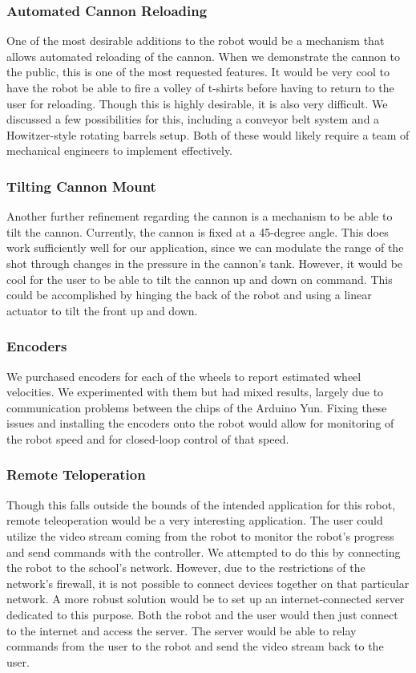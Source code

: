 \documentclass[letterpaper,12pt]{article}
\begin{document}
\subsubsection{Automated Cannon Reloading}
One of the most desirable additions to the robot would be a mechanism that
allows automated reloading of the cannon. When we demonstrate the cannon to the
public, this is one of the most requested features. It would be very cool to
have the robot be able to fire a volley of t-shirts before having to return to
the user for reloading. Though this is highly desirable, it is also very
difficult. We discussed a few possibilities for this, including a conveyor belt
system and a Howitzer-style rotating barrels setup. Both of these would likely
require a team of mechanical engineers to implement effectively.

\subsubsection{Tilting Cannon Mount}
Another further refinement regarding the cannon is a mechanism to be able to
tilt the cannon. Currently, the cannon is fixed at a 45-degree angle. This does
work sufficiently well for our application, since we can modulate the range of
the shot through changes in the pressure in the cannon's tank. However, it would
be cool for the user to be able to tilt the cannon up and down on command. This
could be accomplished by hinging the back of the robot and using a linear
actuator to tilt the front up and down.

\subsubsection{Encoders}
We purchased encoders for each of the wheels to report estimated wheel
velocities. We experimented with them but had mixed results, largely due to
communication problems between the chips of the Arduino Yun. Fixing these issues
and installing the encoders onto the robot would allow for monitoring of the
robot speed and for closed-loop control of that speed.

\subsubsection{Remote Teloperation}
Though this falls outside the bounds of the intended application for this robot,
remote teleoperation would be a very interesting application. The user could
utilize the video stream coming from the robot to monitor the robot's progress
and send commands with the controller. We attempted to do this by connecting the
robot to the school's network. However, due to the restrictions of the network's
firewall, it is not possible to connect devices together on that particular
network. A more robust solution would be to set up an internet-connected server
dedicated to this purpose. Both the robot and the user would then just connect
to the internet and access the server. The server would be able to relay
commands from the user to the robot and send the video stream back to the user.
\end{document}
